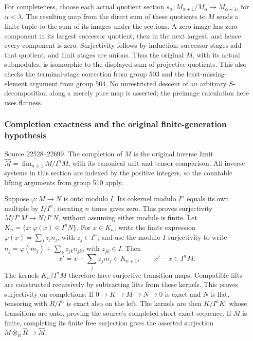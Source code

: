For completeness, choose each actual quotient section \(s_\alpha:M_{\alpha+1}/M_\alpha\to M_{\alpha+1}\), for \(\alpha<\lambda\). The resulting map from the direct sum of these quotients to \(M\) sends a finite tuple to the sum of its images under the sections. A zero image has zero component in its largest successor quotient, then in the next largest, and hence every component is zero. Surjectivity follows by induction: successor stages add that quotient, and limit stages are unions. Thus the original \(M\), with its actual submodules, is isomorphic to the displayed sum of projective quotients. This also checks the terminal-stage correction from group 503 and the least-missing-element argument from group 504. No unrestricted descent of an arbitrary \(S\)-decomposition along a merely pure map is asserted; the preimage calculation here uses flatness.

\subsubsection{Completion exactness and the original finite-generation hypothesis}\label{algebra-proof-014-completion-exactness-and-the-original-finite-generation-hypothesis}

Source 22528--22699. The completion of \(M\) is the original inverse limit \(\widehat M=\lim_{n\geq1}M/I^nM\), with its canonical unit and tensor comparison. All inverse systems in this section are indexed by the positive integers, so the countable lifting arguments from group 510 apply.

Suppose \(\varphi:M\to N\) is onto modulo \(I\). Its cokernel modulo \(I^n\) equals its own multiple by \(I/I^n\); iterating \(n\) times gives zero. This proves surjectivity \(M/I^nM\to N/I^nN\), without assuming either module is finite. Let \(K_n=\{x:\varphi(x)\in I^nN\}\). For \(x\in K_n\), write the finite expression \(\varphi(x)=\sum_jz_jn_j\), with \(z_j\in I^n\), and use the modulo-\(I\) surjectivity to write \(n_j=\varphi(m_j)+\sum_kz_{jk}n_{jk}\), with \(z_{jk}\in I\). Then \[
x'=x-\sum_jz_jm_j\in K_{n+1},
\qquad x'-x\in I^nM .
\] The kernels \(K_n/I^nM\) therefore have surjective transition maps. Compatible lifts are constructed recursively by subtracting lifts from these kernels. This proves surjectivity on completions. If \(0\to K\to M\to N\to0\) is exact and \(N\) is flat, tensoring with \(R/I^n\) is exact also on the left. The kernels are then \(K/I^nK\), whose transitions are onto, proving the source's completed short exact sequence. If \(M\) is finite, completing its finite free surjection gives the asserted surjection \(M\otimes_R\widehat R\to\widehat M\).

